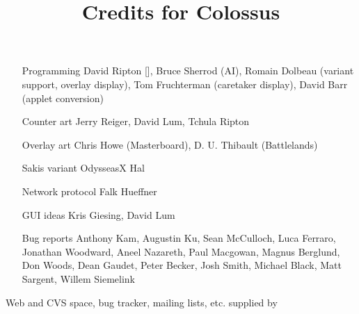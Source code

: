 \documentclass{article}
\begin{document}

\title{Credits for Colossus}

\maketitle

\begin{itemize}

\item[Programming] David Ripton [], Bruce Sherrod (AI), Romain Dolbeau (variant support, overlay display), Tom Fruchterman (caretaker display), David Barr (applet conversion)

\item[Counter art] Jerry Reiger, David Lum, Tchula Ripton

\item[Overlay art] Chris Howe (Masterboard), D. U. Thibault (Battlelands)

\item[Sakis variant] OdysseasX Hal

\item[Network protocol] Falk Hueffner

\item[GUI ideas] Kris Giesing, David Lum

\item[Bug reports] Anthony Kam, Augustin Ku, Sean McCulloch, Luca Ferraro, Jonathan Woodward, Aneel Nazareth, Paul Macgowan, Magnus Berglund, Don Woods, Dean Gaudet, Peter Becker, Josh Smith, Michael Black, Matt Sargent, Willem Siemelink

\end{itemize}

Web and CVS space, bug tracker, mailing lists, etc. supplied by 
\end{document}
